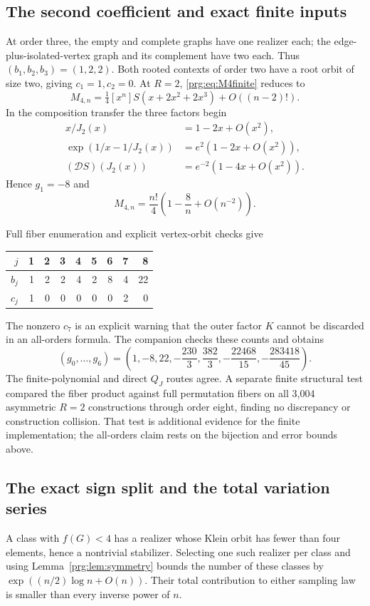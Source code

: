 \documentclass[11pt,letterpaper]{article}
\numberwithin{equation}{section}
\theoremstyle{definition}\newtheorem{definition}[theorem]{Definition}
\theoremstyle{remark}\newtheorem{remark}[theorem]{Remark}
\begin{document}
\subsection{The second coefficient and exact finite inputs}
At order three, the empty and complete graphs have one realizer
each; the edge-plus-isolated-vertex graph and its complement have
two each. Thus $(b_1,b_2,b_3)=(1,2,2)$. Both rooted contexts of
order two have a root orbit of size two, giving $c_1=1,c_2=0$.
At $R=2$, \eqref{prg:eq:M4finite} reduces to
\[
 M_{4,n}=\tfrac14[x^n]S(x+2x^2+2x^3)+O((n-2)!).
\]
In the composition transfer the three factors begin
\begin{align*}
 x/J_2(x)&=1-2x+O(x^2),\\
 \exp(1/x-1/J_2(x))&=e^2(1-2x+O(x^2)),\\
 (\mathcal D S)(J_2(x))&=e^{-2}(1-4x+O(x^2)).
\end{align*}
Hence $g_1=-8$ and
\begin{equation}\label{prg:eq:M4first}
 M_{4,n}=\frac{n!}{4}\left(1-\frac8n+O(n^{-2})\right).
\end{equation}

Full fiber enumeration and explicit vertex-orbit checks give
\begin{center}
\begin{tabular}{r r r r r r r r r}
\toprule
$j$&1&2&3&4&5&6&7&8\\
\midrule
$b_j$&1&2&2&4&2&8&4&22\\
$c_j$&1&0&0&0&0&0&2&0\\
\bottomrule
\end{tabular}
\end{center}
The nonzero $c_7$ is an explicit warning that the outer factor $K$
cannot be discarded in an all-orders formula. The companion checks
these counts and obtains
\[
 (g_0,\ldots,g_6)=
 \left(1,-8,22,-\frac{230}{3},\frac{382}{3},
                 -\frac{22468}{15},-\frac{283418}{45}\right).
\]
The finite-polynomial and direct $Q_J$ routes agree. A separate
finite structural test compared the fiber product against full
permutation fibers on all 3,004 asymmetric $R=2$ constructions
through order eight, finding no discrepancy or construction
collision. That test is additional evidence for the finite
implementation; the all-orders claim rests on the bijection and
error bounds above.

\subsection{The exact sign split and the total variation series}
A class with $f(G)<4$ has a realizer whose Klein orbit has fewer
than four elements, hence a nontrivial stabilizer. Selecting one
such realizer per class and using Lemma~\ref{prg:lem:symmetry} bounds
the number of these classes by
$\exp((n/2)\log n+O(n))$. Their total contribution to either
sampling law is smaller than every inverse power of $n$.
\end{document}
